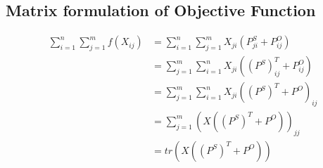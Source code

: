 \subsection{Matrix formulation of Objective Function}
\label{mat_obj_func_proof}

\begin{align}
\sum_{i = 1}^{n} \sum_{j = 1}^{m} f(X_{ij}) &= \sum_{i = 1}^{n} \sum_{j = 1}^{m} X_{ji}\left(P^S_{ji} + P^O_{ij}\right)\\
&=   \sum_{j = 1}^{m}\sum_{i = 1}^{n} X_{ji}\left(\left(P^S\right)^T_{ij} + P^O_{ij}\right)\\
&=   \sum_{j = 1}^{m}\sum_{i = 1}^{n} X_{ji}\left(\left(P^S\right)^T + P^O\right)_{ij}\\
&=   \sum_{j = 1}^{m} \left( X\left(\left(P^S\right)^T + P^O \right)\right)_{jj}\\
&=   tr\left( X\left(\left(P^S\right)^T + P^O \right)\right)\\
\end{align}
